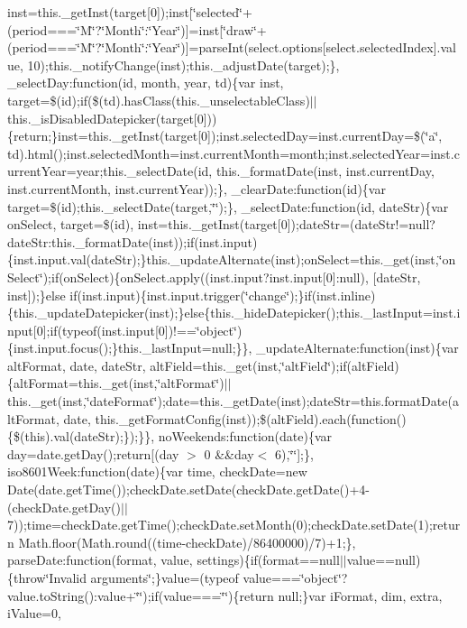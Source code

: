 {{\begin{DoxyParamCaption}
inst=this.\+\_\+get\+Inst(target\mbox{[}0\mbox{]});inst\mbox{[}\char`\"{}selected\char`\"{}+(period===\char`\"{}\+M\char`\"{}?\char`\"{}\+Month\char`\"{}\+:\char`\"{}\+Year\char`\"{})\mbox{]}=inst\mbox{[}\char`\"{}draw\char`\"{}+(period===\char`\"{}\+M\char`\"{}?\char`\"{}\+Month\char`\"{}\+:\char`\"{}\+Year\char`\"{})\mbox{]}=parse\+Int(select.\+options\mbox{[}select.\+selected\+Index\mbox{]}.\+value, 10);this.\+\_\+notify\+Change(inst);this.\+\_\+adjust\+Date(target);\}, \+\_\+select\+Day\+:function(id, month, year, td)\{var inst, target=\$(id);if(\$(td).\+has\+Class(this.\+\_\+unselectable\+Class)$\vert$$\vert$this.\+\_\+is\+Disabled\+Datepicker(target\mbox{[}0\mbox{]}))\{return;\}inst=this.\+\_\+get\+Inst(target\mbox{[}0\mbox{]});inst.\+selected\+Day=inst.\+current\+Day=\$(\char`\"{}a\char`\"{}, td).\+html();inst.\+selected\+Month=inst.\+current\+Month=month;inst.\+selected\+Year=inst.\+current\+Year=year;this.\+\_\+select\+Date(id, this.\+\_\+format\+Date(inst, inst.\+current\+Day, inst.\+current\+Month, inst.\+current\+Year));\}, \+\_\+clear\+Date\+:function(id)\{var target=\$(id);this.\+\_\+select\+Date(target,\char`\"{}\char`\"{});\}, \+\_\+select\+Date\+:function(id, date\+Str)\{var on\+Select, target=\$(id), inst=this.\+\_\+get\+Inst(target\mbox{[}0\mbox{]});date\+Str=(date\+Str!=null?date\+Str\+:this.\+\_\+format\+Date(inst));if(inst.\+input)\{inst.\+input.\+val(date\+Str);\}this.\+\_\+update\+Alternate(inst);on\+Select=this.\+\_\+get(inst,\char`\"{}on\+Select\char`\"{});if(on\+Select)\{on\+Select.\+apply((inst.\+input?inst.\+input\mbox{[}0\mbox{]}\+:null), \mbox{[}date\+Str, inst\mbox{]});\}else if(inst.\+input)\{inst.\+input.\+trigger(\char`\"{}change\char`\"{});\}if(inst.\+inline)\{this.\+\_\+update\+Datepicker(inst);\}else\{this.\+\_\+hide\+Datepicker();this.\+\_\+last\+Input=inst.\+input\mbox{[}0\mbox{]};if(typeof(inst.\+input\mbox{[}0\mbox{]})!==\char`\"{}object\char`\"{})\{inst.\+input.\+focus();\}this.\+\_\+last\+Input=null;\}\}, \+\_\+update\+Alternate\+:function(inst)\{var alt\+Format, date, date\+Str, alt\+Field=this.\+\_\+get(inst,\char`\"{}alt\+Field\char`\"{});if(alt\+Field)\{alt\+Format=this.\+\_\+get(inst,\char`\"{}alt\+Format\char`\"{})$\vert$$\vert$this.\+\_\+get(inst,\char`\"{}date\+Format\char`\"{});date=this.\+\_\+get\+Date(inst);date\+Str=this.\+format\+Date(alt\+Format, date, this.\+\_\+get\+Format\+Config(inst));\$(alt\+Field).\+each(function()\{\$(this).\+val(date\+Str);\});\}\}, no\+Weekends\+:function(date)\{var day=date.\+get\+Day();return\mbox{[}(day $>$ 0 \&\&day$<$ 6),\char`\"{}\char`\"{}\mbox{]};\}, iso8601\+Week\+:function(date)\{var time, check\+Date=new Date(date.\+get\+Time());check\+Date.\+set\+Date(check\+Date.\+get\+Date()+4-\/(check\+Date.\+get\+Day()$\vert$$\vert$7));time=check\+Date.\+get\+Time();check\+Date.\+set\+Month(0);check\+Date.\+set\+Date(1);return Math.\+floor(\+Math.\+round((time-\/check\+Date)/86400000)/7)+1;\}, parse\+Date\+:function(format, value, settings)\{if(format==null$\vert$$\vert$value==null)\{throw\char`\"{}\+Invalid arguments\char`\"{};\}value=(typeof value===\char`\"{}object\char`\"{}?value.\+to\+String()\+:value+\char`\"{}\char`\"{});if(value===\char`\"{}\char`\"{})\{return null;\}var i\+Format, dim, extra, i\+Value=0, 
\end{DoxyParamCaption}}}
